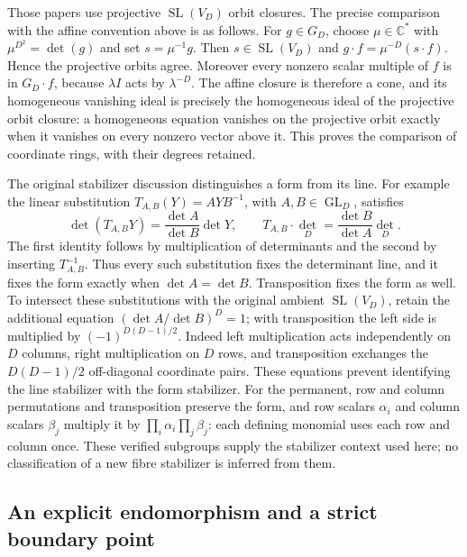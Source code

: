 Those papers use projective $\operatorname{SL}(V_D)$ orbit closures.
The precise comparison with the affine convention above is as follows.
For $g\in G_D$, choose $\mu\in\mathbb C^*$ with
$\mu^{D^2}=\det(g)$ and set $s=\mu^{-1}g$. Then
$s\in\operatorname{SL}(V_D)$ and
$g\cdot f=\mu^{-D}(s\cdot f)$. Hence the projective orbits agree.
Moreover every nonzero scalar multiple of $f$ is in $G_D\cdot f$,
because $\lambda I$ acts by $\lambda^{-D}$. The affine closure is
therefore a cone, and its homogeneous vanishing ideal is precisely the
homogeneous ideal of the projective orbit closure: a homogeneous equation
vanishes on the projective orbit exactly when it vanishes on every
nonzero vector above it. This proves the comparison of coordinate rings,
with their degrees retained.

The original stabilizer discussion distinguishes a form from its line.
For example the linear substitution $T_{A,B}(Y)=AYB^{-1}$, with
$A,B\in\operatorname{GL}_D$, satisfies
\[
 \det(T_{A,B}Y)=\frac{\det A}{\det B}\det Y,
 \qquad
 T_{A,B}\cdot\det_D=\frac{\det B}{\det A}\det_D.
\]
The first identity follows by multiplication of determinants and the
second by inserting $T_{A,B}^{-1}$. Thus every such substitution fixes
the determinant line, and it fixes the form exactly when
$\det A=\det B$. Transposition fixes the form as well. To intersect
these substitutions with the original ambient $\operatorname{SL}(V_D)$,
retain the additional equation
$(\det A/\det B)^D=1$; with transposition the left side is multiplied
by $(-1)^{D(D-1)/2}$. Indeed left multiplication acts independently on
$D$ columns, right multiplication on $D$ rows, and transposition exchanges
the $D(D-1)/2$ off-diagonal coordinate pairs. These equations prevent
identifying the line stabilizer with the form stabilizer.
For the permanent, row and column permutations and transposition preserve
the form, and row scalars $\alpha_i$ and column scalars $\beta_j$
multiply it by $\prod_i\alpha_i\prod_j\beta_j$: each defining monomial
uses each row and column once. These verified subgroups supply the
stabilizer context used here; no classification of a new fibre stabilizer
is inferred from them.

\subsection{An explicit endomorphism and a strict boundary point}


